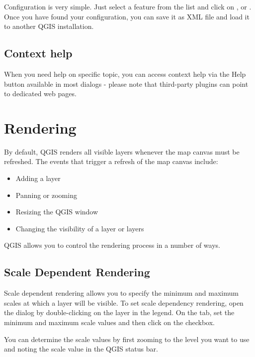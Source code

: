 Configuration is very simple. Just select a feature from the list and click
on ,  or . Once you have
found your configuration, you can save it as XML file and load it to another
QGIS installation.

\subsection{Context help}\label{context_help}

When you need help on specific topic, you can access context help via the Help
button available in most dialogs - please note that third-party plugins can point to
dedicated web pages.

\section{Rendering}\label{subsec:redraw_events}

By default, QGIS renders all visible layers whenever the map canvas must be
refreshed. The events that trigger a refresh of the map canvas include:

\begin{itemize}
\item Adding a layer
\item Panning or zooming
\item Resizing the QGIS window
\item Changing the visibility of a layer or layers
\end{itemize}

QGIS allows you to control the rendering process in a number of ways.

\subsection{Scale Dependent Rendering}
\label{label_scaledepend}

Scale dependent rendering allows you to specify the minimum and maximum
scales at which a layer will be visible.  To set scale dependency rendering,
open the  dialog by double-clicking on the layer in the
legend. On the  tab, set the minimum and maximum scale values and then
click on the  checkbox.

You can determine the scale values by first zooming to the level you want
to use and noting the scale value in the QGIS status bar.

